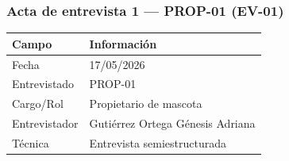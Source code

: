 \documentclass[journal,onecolumn]{IEEEtran}
\begin{document}
	
	\subsubsection*{Acta de entrevista 1 --- PROP-01 (EV-01)}

\begin{table}[H]
	\centering\small
	\begin{tabularx}{\textwidth}{@{}l X@{}}
		\toprule
		\textbf{Campo} & \textbf{Información} \\
		\midrule
		
		Fecha & 17/05/2026 \\
		
		Entrevistado & PROP-01 \\
		
		Cargo/Rol & Propietario de mascota \\
		
		Entrevistador & Gutiérrez Ortega Génesis Adriana \\
		
		Técnica & Entrevista semiestructurada \\
		
		\bottomrule
	\end{tabularx}
\end{table}
\end{document}
